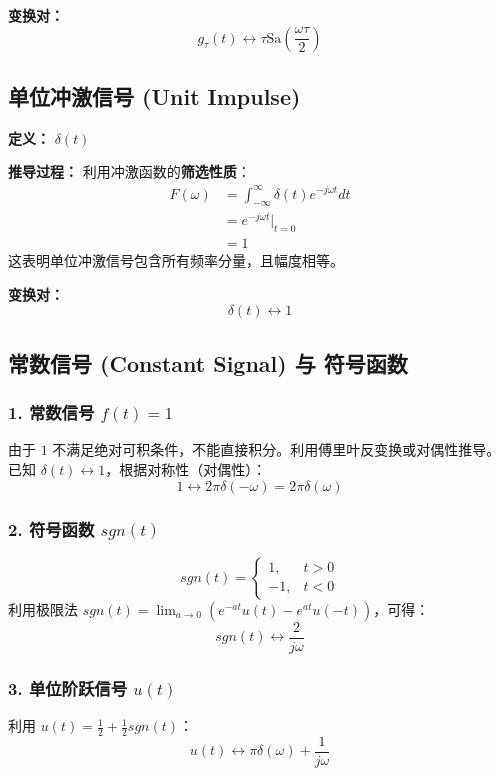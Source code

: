 \textbf{变换对：}
\[ g_\tau(t) \longleftrightarrow \tau \text{Sa}\left(\frac{\omega \tau}{2}\right) \]

\hrulefill

\subsection{单位冲激信号 (Unit Impulse)}
\textbf{定义：} $\delta(t)$

\textbf{推导过程：}
利用冲激函数的\textbf{筛选性质}：
\begin{align*}
    F(\omega) &= \int_{-\infty}^{\infty} \delta(t) e^{-j\omega t} dt \\
    &= e^{-j\omega t} \Big|_{t=0} \\
    &= 1
\end{align*}
这表明单位冲激信号包含所有频率分量，且幅度相等。

\textbf{变换对：}
\[ \delta(t) \longleftrightarrow 1 \]

\hrulefill

\subsection{常数信号 (Constant Signal) 与 符号函数}

\subsubsection{1. 常数信号 $f(t)=1$}
由于 $1$ 不满足绝对可积条件，不能直接积分。利用傅里叶反变换或对偶性推导。
已知 $\delta(t) \leftrightarrow 1$，根据对称性（对偶性）：
\[ 1 \longleftrightarrow 2\pi \delta(-\omega) = 2\pi \delta(\omega) \]

\subsubsection{2. 符号函数 $sgn(t)$}
\[ sgn(t) = \begin{cases} 1, & t>0 \\ -1, & t<0 \end{cases} \]
利用极限法 $sgn(t) = \lim_{a \to 0} (e^{-at}u(t) - e^{at}u(-t))$，可得：
\[ sgn(t) \longleftrightarrow \frac{2}{j\omega} \]

\subsubsection{3. 单位阶跃信号 $u(t)$}
利用 $u(t) = \frac{1}{2} + \frac{1}{2}sgn(t)$：
\[ u(t) \longleftrightarrow \pi \delta(\omega) + \frac{1}{j\omega} \]

